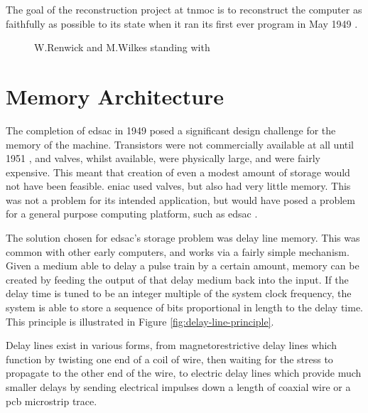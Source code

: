 The goal of the reconstruction project at \gls{tnmoc} is to reconstruct the computer as faithfully as possible to its state when it ran its first ever program in May 1949 \cite{nmoc2017}.


\begin{figure}[ht]
	\centering
	\caption{W.Renwick and M.Wilkes standing with  \cite{cam2011b}}
	\label{fig:edsac-photo}
\end{figure}

\section{ Memory Architecture} \label{sec:edsac-mem-arch}
The completion of \gls{edsac} in 1949 posed a significant design challenge for the memory of the machine. Transistors were not commercially available at all until 1951 \cite{bonne2007}, and valves, whilst available, were physically large, and were fairly expensive. This meant that creation of even a modest amount of storage would not have been feasible. \Gls{eniac} used valves, but also had very little memory. This was not a problem for its intended application, but would have posed a problem for a general purpose computing platform, such as \gls{edsac} \cite[p.208]{wilkes1948}.

The solution chosen for \gls{edsac}'s storage problem was delay line memory. This was common with other early computers, and works via a fairly simple mechanism. Given a medium able to delay a pulse train by a certain amount, memory can be created by feeding the output of that delay medium back into the input. If the delay time is tuned to be an integer multiple of the system clock frequency, the system is able to store a sequence of bits proportional in length to the delay time. This principle is illustrated in Figure \ref{fig:delay-line-principle}.

Delay lines exist in various forms, from magnetorestrictive delay lines which function by twisting one end of a coil of wire, then waiting for the stress to propagate to the other end of the wire, to electric delay lines which provide much smaller delays by sending electrical impulses down a length of coaxial wire or a \gls{pcb} microstrip trace.

